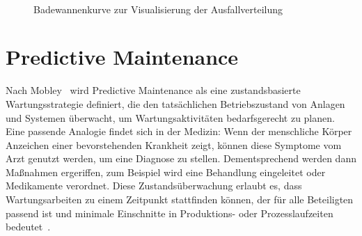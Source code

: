 \begin{figure}[H]
    \centering
    \caption{Badewannenkurve zur Visualisierung der Ausfallverteilung}
~\label{fig:bathtub}
\end{figure}

\section{Predictive Maintenance}
Nach Mobley~\Cite[S.~4]{Mobley2002} wird Predictive Maintenance als eine zustandsbasierte Wartungsstrategie definiert, die den
tatsächlichen Betriebszustand von Anlagen und Systemen überwacht, um Wartungsaktivitäten bedarfsgerecht zu planen.
Eine passende Analogie findet sich in der Medizin: Wenn der menschliche Körper Anzeichen einer bevorstehenden Krankheit zeigt, können
diese Symptome vom Arzt genutzt werden, um eine Diagnose zu stellen. Dementsprechend werden dann Maßnahmen ergeriffen, zum Beispiel
wird eine Behandlung eingeleitet oder Medikamente verordnet. Diese Zustandsüberwachung erlaubt es, dass Wartungsarbeiten zu einem
Zeitpunkt stattfinden können, der für alle Beteiligten passend ist und minimale Einschnitte in Produktions- oder Prozesslaufzeiten
bedeutet~\cite[S.~3]{Scheffer2004}.


